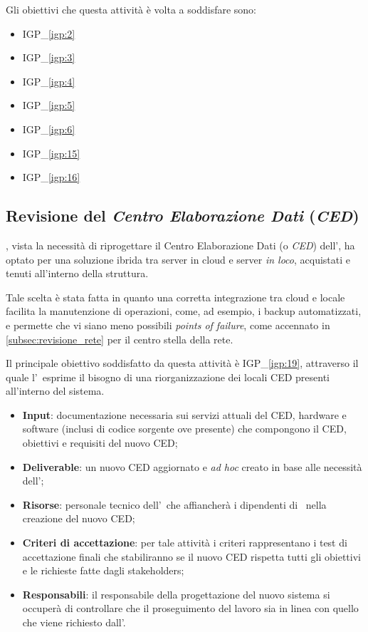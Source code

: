 		Gli obiettivi che questa attività è volta a soddisfare sono:
		\begin{itemize}[noitemsep]
			\renewcommand\labelitemi{--}
			\item {\color{pantone}IGP\_\ref{igp:2}}
			\item {\color{pantone}IGP\_\ref{igp:3}}
			\item {\color{pantone}IGP\_\ref{igp:4}}
			\item {\color{pantone}IGP\_\ref{igp:5}}
			\item {\color{pantone}IGP\_\ref{igp:6}}
			\item {\color{pantone}IGP\_\ref{igp:15}}
			\item {\color{pantone}IGP\_\ref{igp:16}}
		\end{itemize}
	
	\subsection{Revisione del \textit{Centro Elaborazione Dati} (\textit{CED})}
		
		\azienda, vista la necessità di riprogettare il Centro Elaborazione Dati (o \textit{CED}) dell'\istituto, ha optato per una soluzione ibrida tra server in cloud e server \textit{in loco}, acquistati e tenuti all'interno della struttura.
		
		Tale scelta è stata fatta in quanto una corretta integrazione tra cloud e locale facilita la manutenzione di operazioni, come, ad esempio, i backup automatizzati, e permette che vi siano meno possibili \textit{points of failure}, come accennato in \ref{subsec:revisione_rete} per il centro stella della rete.
		
		Il principale obiettivo soddisfatto da questa attività è {\color{pantone}IGP\_\ref{igp:19}}, attraverso il quale l'\istituto~esprime il bisogno di una riorganizzazione dei locali CED presenti all'interno del sistema.
		
		\begin{itemize}[noitemsep]
			\renewcommand\labelitemi{--}
			\item \textbf{Input}: documentazione necessaria sui servizi attuali del CED, hardware e software (inclusi di codice sorgente ove presente) che compongono il CED, obiettivi e requisiti del nuovo CED;
			\item \textbf{Deliverable}: un nuovo CED aggiornato e \textit{ad hoc} creato in base alle necessità dell'\istituto;
			\item \textbf{Risorse}: personale tecnico dell'\istituto~che affiancherà i dipendenti di \azienda~nella creazione del nuovo CED;
			\item \textbf{Criteri di accettazione}: per tale attività i criteri rappresentano i test di accettazione finali che stabiliranno se il nuovo CED rispetta tutti gli obiettivi e le richieste fatte dagli stakeholders;
			\item \textbf{Responsabili}: il responsabile della progettazione del nuovo sistema si occuperà di controllare che il proseguimento del lavoro sia in linea con quello che viene richiesto dall'\istituto.
		\end{itemize}
		
